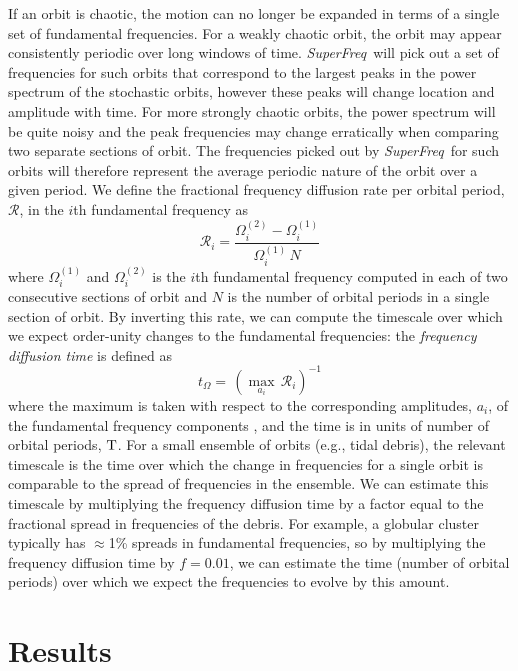 \documentclass[letterpaper,12pt,preprint]{aastex}
\newcommand{\project}[1]{\textsl{#1}}
\newcommand{\superfreq}{\project{SuperFreq}}
\begin{document}
If an orbit is chaotic, the motion can no longer be expanded in terms of a single set of fundamental frequencies. For a weakly chaotic orbit, the orbit may appear consistently periodic over long windows of time. \superfreq\ will pick out a set of frequencies for such orbits that correspond to the largest peaks in the power spectrum of the stochastic orbits, however these peaks will change location and amplitude with time. For more strongly chaotic orbits, the power spectrum will be quite noisy and the peak frequencies may change erratically when comparing two separate sections of orbit. The frequencies picked out by \superfreq\ for such orbits will therefore represent the average periodic nature of the orbit over a given period. We define the fractional frequency diffusion rate per orbital period, $\mathcal{R}$, in the $i$th fundamental frequency as
\begin{equation}
	\mathcal{R}_i = \frac{\Omega_i^{(2)} - \Omega_{i}^{(1)}}{\Omega_{i}^{(1)} \, N} \label{eq:fdrate}
\end{equation}
where $\Omega_i^{(1)}$ and $\Omega_i^{(2)}$ is the $i$th fundamental frequency computed in each of two consecutive sections of orbit and $N$ is the number of orbital periods in a single section of orbit. By inverting this rate, we can compute the timescale over which we expect order-unity changes to the fundamental frequencies: the \emph{frequency diffusion time} is defined as
\begin{equation}
	t_\Omega = \, (\max_{a_i} \, \mathcal{R}_i)^{-1} \label{eq:fdtime}
\end{equation}
where the maximum is taken with respect to the corresponding amplitudes, $a_i$, of the fundamental frequency components \citep[see][]{valluri12}, and the time is in units of number of orbital periods, ${\rm T}$. For a small ensemble of orbits (e.g., tidal debris), the relevant timescale is the time over which the change in frequencies for a single orbit is comparable to the spread of frequencies in the ensemble. We can estimate this timescale by multiplying the frequency diffusion time by a factor equal to the fractional spread in frequencies of the debris. For example, a globular cluster typically has $\approx$1\% spreads in fundamental frequencies, so by multiplying the frequency diffusion time by $f = 0.01$, we can estimate the time (number of orbital periods) over which we expect the frequencies to evolve by this amount.

%
\section{Results}
\end{document}
